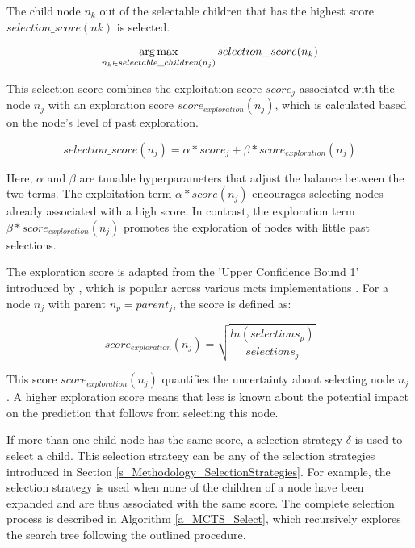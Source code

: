 The child node $n_k$ out of the selectable children that has the highest score $selection\_score(nk)$ is selected.

\begin{equation}
    \operatorname*{arg\,max}_{n_k \in selectable\_children(n_j)} selection\_score(n_k)
\end{equation}

This selection score combines the exploitation score $score_j$ associated with the node $n_j$ with an exploration score $score_{exploration}(n_j)$, which is calculated based on the node's level of past exploration.

\begin{equation}
    selection\_score(n_j) = \alpha * score_j + \beta * score_{exploration}(n_j)
\end{equation}

Here, $\alpha$ and $\beta$ are tunable hyperparameters that adjust the balance between the two terms. The exploitation term $\alpha * score(n_j)$ encourages selecting nodes already associated with a high score. In contrast, the exploration term $\beta * score_{exploration}(n_j)$ promotes the exploration of nodes with little past selections.

The exploration score is adapted from the 'Upper Confidence Bound 1' introduced by \cite{auer_finite-time_2002}, which is popular across various \gls{mcts} implementations \cite{kocsis_bandit_2006, browne_survey_2012}. For a node $n_j$ with parent $n_p = parent_j$, the score is defined as:

\begin{equation}
    score_{exploration}(n_j) = \sqrt{\frac{ln(selections_p)}{selections_j}}
\end{equation}

This score $score_{exploration}(n_j)$ quantifies the uncertainty about selecting node $n_j$ \cite{auer_finite-time_2002, browne_survey_2012}. A higher exploration score means that less is known about the potential impact on the prediction that follows from selecting this node.

If more than one child node has the same score, a selection strategy $\delta$ is used to select a child. This selection strategy can be any of the selection strategies introduced in Section \ref{s_Methodology_SelectionStrategies}. For example, the selection strategy is used when none of the children of a node have been expanded and are thus associated with the same score. The complete selection process is described in Algorithm \ref{a_MCTS_Select}, which recursively explores the search tree following the outlined procedure.

